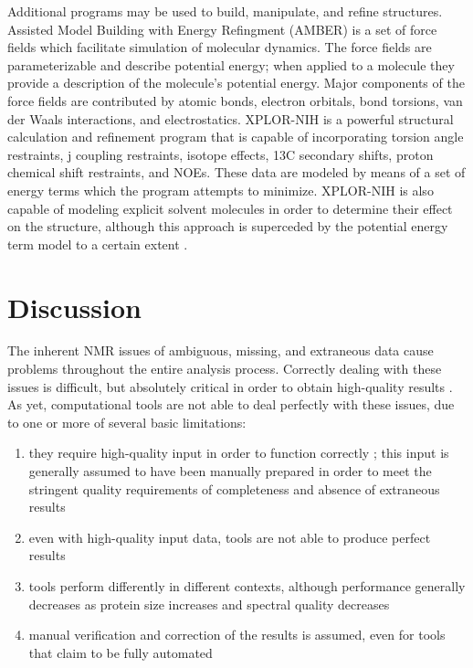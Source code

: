 Additional programs may be used to build, manipulate, and refine structures.
Assisted Model Building with Energy Refingment (AMBER) \cite{amber} is a set 
of force fields which facilitate simulation of molecular dynamics.  The
force fields are parameterizable and describe potential energy; when applied
to a molecule they provide a description of the molecule's potential energy. 
Major components of the force fields are contributed by atomic bonds, 
electron orbitals, bond torsions, van der Waals interactions, and electrostatics.
XPLOR-NIH \cite{xplor-nih} is a
powerful structural calculation and refinement program that is capable of
incorporating torsion angle restraints, j coupling restraints, isotope 
effects, 13C secondary shifts, proton chemical shift restraints, and NOEs.
These data are modeled by means of a set of energy terms which the program
attempts to minimize.  XPLOR-NIH is also capable of modeling explicit 
solvent molecules in order to determine their effect on the structure, 
although this approach is superceded by the potential energy term model
to a certain extent \cite{xplor-nih}.



\section{Discussion}

The inherent NMR issues of ambiguous, missing, and extraneous data cause 
problems throughout the entire analysis process.  Correctly dealing with 
these issues is difficult, but absolutely critical in order to obtain 
high-quality results \cite{williamson2009automated, guntert2009automated, 
altieri2004automation, baran2004automated}.  As yet, computational tools 
are not able to deal perfectly with these issues, due to one or more of 
several basic limitations: 
\begin{enumerate}
  \item they require high-quality input in order to function correctly 
  \cite{saga, abacus_assignment, mars, autoassign2001, ezassign, pine, cyana2004}; 
  this input is generally assumed to have been manually prepared in order 
  to meet the stringent quality requirements of completeness and absence of 
  extraneous results
  \item even with high-quality input data, tools are not able to produce 
  perfect results 
  \item tools perform differently in different contexts, although 
  performance generally decreases as protein size increases and spectral quality 
  decreases
  \item manual verification and correction of the results is assumed, 
  even for tools that claim to be fully automated 
  \cite{williamson2009automated, guntert2009automated, altieri2004automation,
  baran2004automated}
\end{enumerate}

